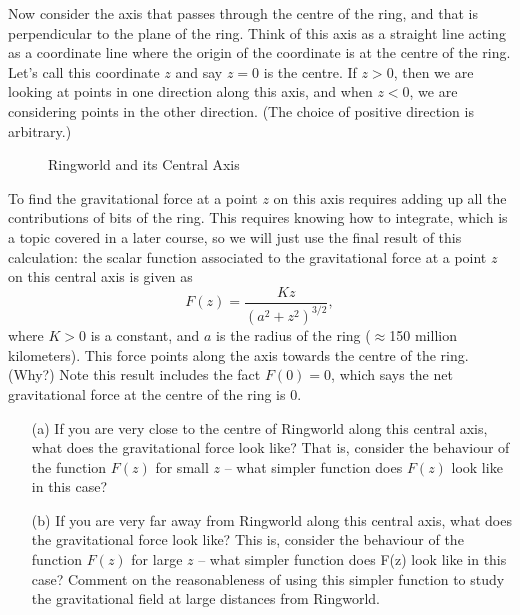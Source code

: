 \documentclass{exam}
\begin{document}
\begin{questions}
Now consider the axis that passes through the centre of the ring, and that is perpendicular to the plane of the ring. Think of this axis as a straight line acting as a coordinate line where the origin of the coordinate is at the centre of the ring. Let's call this coordinate $z$ and say $z=0$ is the centre. If $z>0$, then we are looking at points in one direction along this axis, and when $z<0$, we are considering points in the other direction. (The choice of positive direction is arbitrary.) 


\begin{figure}[h]
\begin{center}
\caption{Ringworld and its Central Axis}
\end{center}
\end{figure}



To find the gravitational force at a point $z$ on this axis requires adding up all the contributions of bits of the ring. This requires knowing how to integrate, which is a topic covered in a later course, so we will just use the final result of this calculation: the scalar function associated to the gravitational force at a point $z$ on this central axis is given as $$F(z)=\frac{Kz}{(a^2+z^2)^{3/2}},$$ where $K>0$ is a constant, and $a$ is the radius of the ring ($\approx$150 million kilometers). This force points along the axis towards the centre of the ring. (Why?)  Note this result includes the fact $F(0)=0$, which says the net gravitational force at the centre of the ring is 0. 

\begin{enumerate}
\item[(a)] If you are very close to the centre of Ringworld along this central axis, what does the gravitational force look like?  That is, consider the behaviour of the function $F(z)$ for small $z$ -- what simpler function does $F(z)$ look like in this case? 

\item[(b)] If you are very far away from Ringworld along this central axis, what does the gravitational force look like? This is, consider the behaviour of the function $F(z)$ for large $z$ -- what simpler function does F(z) look like in this case?  Comment on the reasonableness of using this simpler function to study the gravitational field at large distances from Ringworld.


\end{enumerate}
\end{questions}
\end{document}
